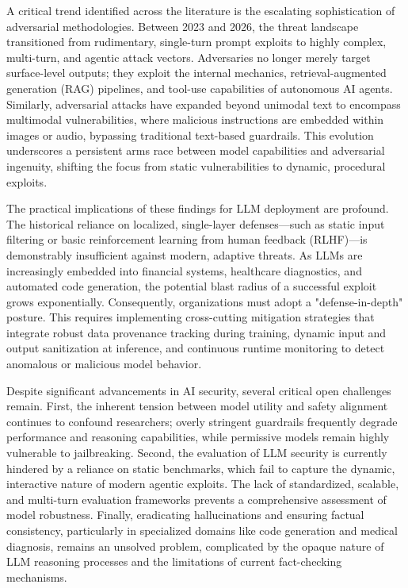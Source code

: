 \documentclass[11pt,a4paper]{article}
\begin{document}
A critical trend identified across the literature is the escalating sophistication of adversarial methodologies. Between 2023 and 2026, the threat landscape transitioned from rudimentary, single-turn prompt exploits to highly complex, multi-turn, and agentic attack vectors. Adversaries no longer merely target surface-level outputs; they exploit the internal mechanics, retrieval-augmented generation (RAG) pipelines, and tool-use capabilities of autonomous AI agents. Similarly, adversarial attacks have expanded beyond unimodal text to encompass multimodal vulnerabilities, where malicious instructions are embedded within images or audio, bypassing traditional text-based guardrails. This evolution underscores a persistent arms race between model capabilities and adversarial ingenuity, shifting the focus from static vulnerabilities to dynamic, procedural exploits.

The practical implications of these findings for LLM deployment are profound. The historical reliance on localized, single-layer defenses---such as static input filtering or basic reinforcement learning from human feedback (RLHF)---is demonstrably insufficient against modern, adaptive threats. As LLMs are increasingly embedded into financial systems, healthcare diagnostics, and automated code generation, the potential blast radius of a successful exploit grows exponentially. Consequently, organizations must adopt a "defense-in-depth" posture. This requires implementing cross-cutting mitigation strategies that integrate robust data provenance tracking during training, dynamic input and output sanitization at inference, and continuous runtime monitoring to detect anomalous or malicious model behavior.

Despite significant advancements in AI security, several critical open challenges remain. First, the inherent tension between model utility and safety alignment continues to confound researchers; overly stringent guardrails frequently degrade performance and reasoning capabilities, while permissive models remain highly vulnerable to jailbreaking. Second, the evaluation of LLM security is currently hindered by a reliance on static benchmarks, which fail to capture the dynamic, interactive nature of modern agentic exploits. The lack of standardized, scalable, and multi-turn evaluation frameworks prevents a comprehensive assessment of model robustness. Finally, eradicating hallucinations and ensuring factual consistency, particularly in specialized domains like code generation and medical diagnosis, remains an unsolved problem, complicated by the opaque nature of LLM reasoning processes and the limitations of current fact-checking mechanisms.
\end{document}
